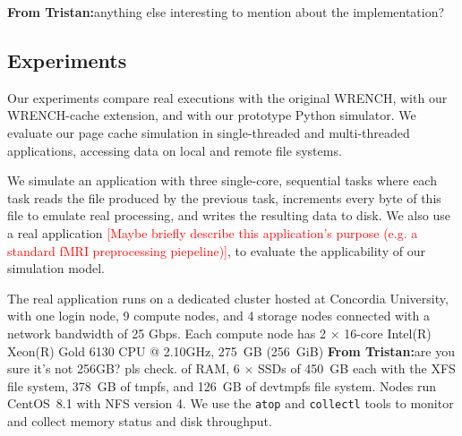 \documentclass[conference]{IEEEtran}
\newcommand{\tristan}[1]{\color{orange}\textbf{From Tristan:}#1\color{black}}
\begin{document}
\tristan{anything else interesting to mention about the implementation?}

        \subsection{Experiments}

        Our experiments compare real executions with the original WRENCH,
        with our WRENCH-cache extension, and with our prototype Python simulator. We
        evaluate our page cache simulation in single-threaded and
        multi-threaded applications, accessing data on local and remote
        file systems.

        We simulate an application with three single-core, sequential tasks
        where each task reads the file produced by the previous task,
        increments every byte of this file to emulate real processing, and
        writes the resulting data to disk. We also use a real application
        \textcolor{red}{[Maybe briefly describe this application's purpose
        (e.g. a standard fMRI preprocessing piepeline)]}, to evaluate the
        applicability of our simulation model.

        The real application runs on a dedicated cluster hosted at
        Concordia University, with one login node, 9 compute nodes, and 4
        storage nodes connected with a network bandwidth of 25 Gbps. Each
        compute node has 2 $\times$ 16-core Intel(R) Xeon(R) Gold 6130 CPU
        @ 2.10GHz, 275~GB (256~GiB) \tristan{are you sure it's not 256GB?
        pls check.} of RAM, 6 $\times$ SSDs of 450~GB each with the XFS
        file system, 378~GB of tmpfs, and 126~GB of devtmpfs file system.
        Nodes run CentOS~8.1 with NFS version 4. We use the \texttt{atop}
        and \texttt{collectl} tools to monitor and collect memory status
        and disk throughput.
\end{document}

